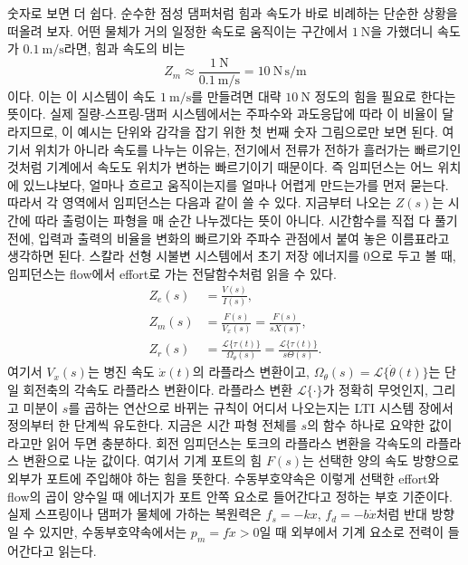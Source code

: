 숫자로 보면 더 쉽다.
순수한 점성 댐퍼처럼 힘과 속도가 바로 비례하는 단순한 상황을 떠올려 보자.
어떤 물체가 거의 일정한 속도로 움직이는 구간에서 $1~\mathrm{N}$을 가했더니 속도가 $0.1~\mathrm{m/s}$라면, 힘과 속도의 비는
\begin{equation}
  Z_m \approx \frac{1~\mathrm{N}}{0.1~\mathrm{m/s}}
  =
  10~\mathrm{N\,s/m}
\end{equation}
이다.
이는 이 시스템이 속도 $1~\mathrm{m/s}$를 만들려면 대략 $10~\mathrm{N}$ 정도의 힘을 필요로 한다는 뜻이다.
실제 질량-스프링-댐퍼 시스템에서는 주파수와 과도응답에 따라 이 비율이 달라지므로, 이 예시는 단위와 감각을 잡기 위한 첫 번째 숫자 그림으로만 보면 된다.
여기서 위치가 아니라 속도를 나누는 이유는, 전기에서 전류가 전하가 흘러가는 빠르기인 것처럼 기계에서 속도도 위치가 변하는 빠르기이기 때문이다.
즉 임피던스는 어느 위치에 있느냐보다, 얼마나 흐르고 움직이는지를 얼마나 어렵게 만드는가를 먼저 묻는다.
따라서 각 영역에서 임피던스는 다음과 같이 쓸 수 있다.
지금부터 나오는 $Z(s)$는 시간에 따라 출렁이는 파형을 매 순간 나누겠다는 뜻이 아니다.
시간함수를 직접 다 풀기 전에, 입력과 출력의 비율을 변화의 빠르기와 주파수 관점에서 붙여 놓은 이름표라고 생각하면 된다.
스칼라 선형 시불변 시스템에서 초기 저장 에너지를 0으로 두고 볼 때, 임피던스는 flow에서 effort로 가는 전달함수처럼 읽을 수 있다.
\begin{align}
  Z_e(s) &= \frac{V(s)}{I(s)}, \\
  Z_m(s) &= \frac{F(s)}{V_x(s)}=\frac{F(s)}{sX(s)}, \\
  Z_r(s) &= \frac{\mathcal{L}\{\tau(t)\}}{\Omega_\theta(s)}
  =
  \frac{\mathcal{L}\{\tau(t)\}}{s\Theta(s)}.
\end{align}
여기서 $V_x(s)$는 병진 속도 $\dot{x}(t)$의 라플라스 변환이고, $\Omega_\theta(s)=\mathcal{L}\{\dot{\theta}(t)\}$는 단일 회전축의 각속도 라플라스 변환이다.
라플라스 변환 $\mathcal{L}\{\cdot\}$가 정확히 무엇인지, 그리고 미분이 $s$를 곱하는 연산으로 바뀌는 규칙이 어디서 나오는지는 LTI 시스템 장에서 정의부터 한 단계씩 유도한다.
지금은 시간 파형 전체를 $s$의 함수 하나로 요약한 값이라고만 읽어 두면 충분하다.
%
회전 임피던스는 토크의 라플라스 변환을 각속도의 라플라스 변환으로 나눈 값이다.
여기서 기계 포트의 힘 $F(s)$는 선택한 양의 속도 방향으로 외부가 포트에 주입해야 하는 힘을 뜻한다.
수동부호약속은 이렇게 선택한 effort와 flow의 곱이 양수일 때 에너지가 포트 안쪽 요소로 들어간다고 정하는 부호 기준이다.
실제 스프링이나 댐퍼가 물체에 가하는 복원력은 $f_s=-kx$, $f_d=-b\dot{x}$처럼 반대 방향일 수 있지만, 수동부호약속에서는 $p_m=f\dot{x}>0$일 때 외부에서 기계 요소로 전력이 들어간다고 읽는다.
